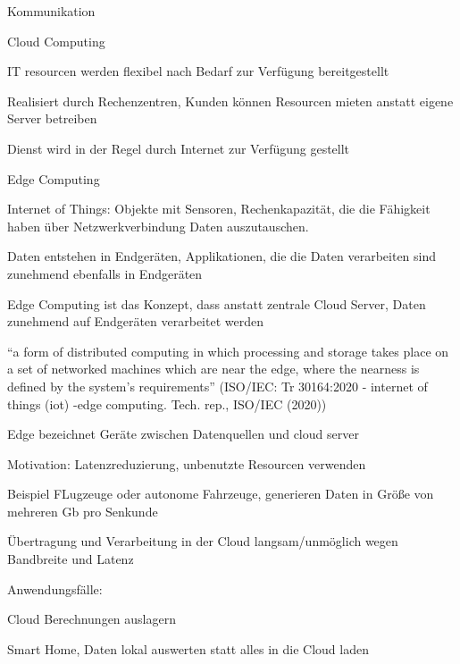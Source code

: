 \begin{notes}
\item Kommunikation
    \begin{notes}
        \item Cloud Computing
        \begin{notes}
            \item IT resourcen werden flexibel nach Bedarf zur Verfügung bereitgestellt
            \item Realisiert durch Rechenzentren, Kunden können Resourcen mieten anstatt eigene Server betreiben
            \item Dienst wird in der Regel durch Internet zur Verfügung gestellt
        \end{notes}
        \item Edge Computing
        \begin{notes}
            \item Internet of Things: Objekte mit Sensoren, Rechenkapazität, die die Fähigkeit haben über Netzwerkverbindung Daten auszutauschen.
            \item Daten entstehen in Endgeräten, Applikationen, die die Daten verarbeiten sind zunehmend ebenfalls in Endgeräten
            \item Edge Computing ist das Konzept, dass anstatt zentrale Cloud Server, Daten zunehmend auf Endgeräten verarbeitet werden
            \item “a form of distributed computing in which processing and storage takes place on a set of networked machines which are near the edge, where the nearness is defined by the system’s requirements”  (ISO/IEC: Tr 30164:2020 - internet of things (iot) -edge computing. Tech. rep., ISO/IEC (2020))
            \item Edge bezeichnet Geräte zwischen Datenquellen und cloud server
            \item Motivation: Latenzreduzierung, unbenutzte Resourcen verwenden
            \item Beispiel FLugzeuge oder autonome Fahrzeuge, generieren Daten in Größe von mehreren Gb pro Senkunde
            \item Übertragung und Verarbeitung in der Cloud langsam/unmöglich wegen Bandbreite und Latenz
            \item Anwendungsfälle:
            \begin{notes}
                \item Cloud Berechnungen auslagern
                \item Smart Home, Daten lokal auswerten statt alles in die Cloud laden

\end{notes}
\end{notes}
\end{notes}
\end{notes}
